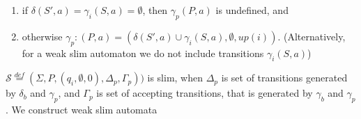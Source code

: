 \documentclass[
	digital
nolof, nolot
]{fithesis3}
\newcommand{\cS}{\mathcal{S}}
\newcommand{\eqdef}{\overset{def}{=}}
\begin{document}
		
			\begin{enumerate}
				\item if $\delta(S',a)=\gamma_{i}(S, a)=\emptyset$, then $ \gamma_{p}(P,a)$ is undefined, and
				\item otherwise $\gamma_p \colon (P,a) = (\delta(S',a)\cup \gamma_{i}(S, a), \emptyset, up(i))$. (Alternatively, for a weak slim automaton we do not include transitions $\gamma_{i}(S, a)$)
			\end{enumerate}
			$\cS\eqdef(\Sigma, P, (q_i,\emptyset,0), \Delta_p,\Gamma_p))$ is slim, when $\Delta_p$ is set of transitions generated by $\delta_b$ and $\gamma_p$, and $\Gamma_p$ is set of accepting transitions, that is generated by $\gamma_b$ and $\gamma_p$. We construct weak slim automata 
			
\end{document}
